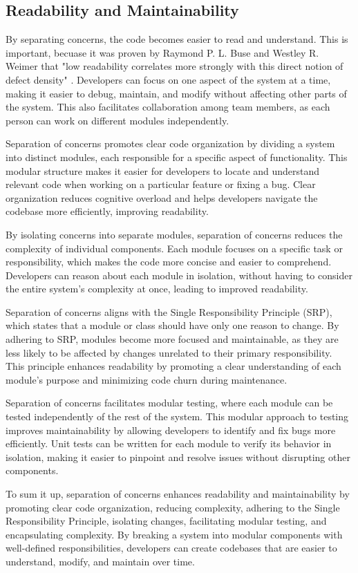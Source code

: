 \subsection{Readability and Maintainability}
By separating concerns, the code becomes easier to read and understand.
This is important, becuase it was proven by Raymond P. L. Buse and Westley R. Weimer that 
"low readability correlates more strongly with this direct notion of defect density" \cite{readabilityMaintainability}.
Developers can focus on one aspect of the system at a time, making it easier to debug, maintain, and modify without affecting other parts of the system.
This also facilitates collaboration among team members, as each person can work on different modules independently.
\par
Separation of concerns promotes clear code organization by dividing a system into distinct modules, each responsible for a specific aspect of functionality.
This modular structure makes it easier for developers to locate and understand relevant code when working on a particular feature or fixing a bug.
Clear organization reduces cognitive overload and helps developers navigate the codebase more efficiently, improving readability.
\par
By isolating concerns into separate modules, separation of concerns reduces the complexity of individual components.
Each module focuses on a specific task or responsibility, which makes the code more concise and easier to comprehend.
Developers can reason about each module in isolation, without having to consider the entire system's complexity at once, leading to improved readability.
\par
Separation of concerns aligns with the Single Responsibility Principle (SRP), which states that a module or class should have only one reason to change.
By adhering to SRP, modules become more focused and maintainable, as they are less likely to be affected by changes unrelated to their primary responsibility.
This principle enhances readability by promoting a clear understanding of each module's purpose and minimizing code churn during maintenance.
\par
Separation of concerns facilitates modular testing, where each module can be tested independently of the rest of the system.
This modular approach to testing improves maintainability by allowing developers to identify and fix bugs more efficiently.
Unit tests can be written for each module to verify its behavior in isolation, making it easier to pinpoint and resolve issues without disrupting other components.
\par
To sum it up, separation of concerns enhances readability and maintainability by promoting clear code organization, reducing complexity, adhering to the Single Responsibility Principle, isolating changes, facilitating modular testing, and encapsulating complexity.
By breaking a system into modular components with well-defined responsibilities, developers can create codebases that are easier to understand, modify, and maintain over time.



